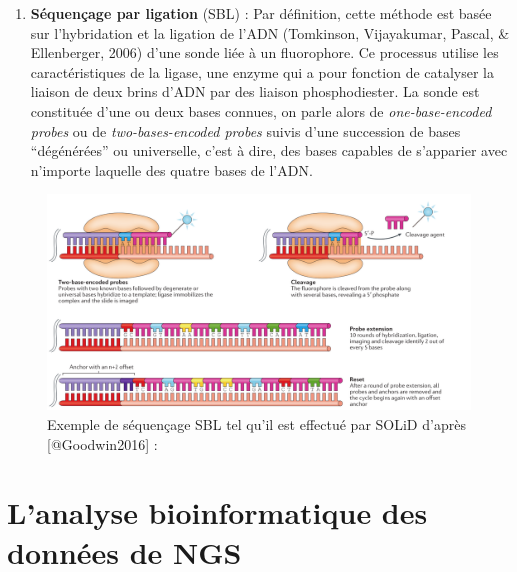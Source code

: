 \documentclass[12pt,twoside]{reedthesis}
\providecommand{\tightlist}{%
  \setlength{\itemsep}{0pt}\setlength{\parskip}{0pt}}
\theoremstyle{definition}
\theoremstyle{definition}
\theoremstyle{remark}
\begin{document}
  \begin{enumerate}
  \def\labelenumi{\arabic{enumi}.}
  \setcounter{enumi}{1}
  \tightlist
  \item
    \textbf{Séquençage par ligation} (SBL) : Par définition, cette méthode
    est basée sur l'hybridation et la ligation de l'ADN (Tomkinson,
    Vijayakumar, Pascal, \& Ellenberger, 2006) d'une sonde liée à un
    fluorophore. Ce processus utilise les caractéristiques de la ligase,
    une enzyme qui a pour fonction de catalyser la liaison de deux brins
    d'ADN par des liaison phosphodiester. La sonde est constituée d'une ou
    deux bases connues, on parle alors de \emph{one-base-encoded probes}
    ou de \emph{two-bases-encoded probes} suivis d'une succession de bases
    ``dégénérées'' ou universelle, c'est à dire, des bases capables de
    s'apparier avec n'importe laquelle des quatre bases de l'ADN.
  \end{enumerate}
  
  \begin{figure}
  
  {\centering \includegraphics[scale=.26]{figure/SBL_seq_solid} 
  
  }
  
  \caption[Exemple de séquençage SBL tel qu'il est effectué par SOLiD]{Exemple de séquençage SBL tel qu'il est effectué par SOLiD d'après [@Goodwin2016] : }\label{fig:sblSeq}
  \end{figure}
  
  \section{L'analyse bioinformatique des données de
  NGS}\label{lanalyse-bioinformatique-des-donnees-de-ngs}
  
\end{document}
